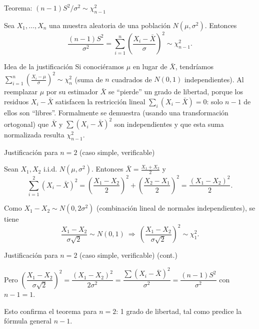\documentclass[aspectratio=169,11pt]{beamer}
\begin{document}
\begin{frame}{Teorema: $(n-1)S^2/\sigma^2 \sim \chi^2_{n-1}$}
\begin{theorem}
Sea $X_1,\dots,X_n$ una muestra aleatoria de una población $N(\mu,\sigma^2)$. Entonces
$$\frac{(n-1)S^2}{\sigma^2} = \sum_{i=1}^n \left(\frac{X_i-\bar X}{\sigma}\right)^2 \sim \chi^2_{n-1}.$$
\end{theorem}

\begin{block}{Idea de la justificación}
Si conociéramos $\mu$ en lugar de $\bar X$, tendríamos $\sum_{i=1}^n \left(\frac{X_i-\mu}{\sigma}\right)^2 \sim \chi^2_n$ (suma de $n$ cuadrados de $N(0,1)$ independientes). Al reemplazar $\mu$ por su estimador $\bar X$ se ``pierde'' un grado de libertad, porque los residuos $X_i-\bar X$ satisfacen la restricción lineal $\sum_i (X_i-\bar X)=0$: solo $n-1$ de ellos son ``libres''. Formalmente se demuestra (usando una transformación ortogonal) que $\bar X$ y $\sum(X_i-\bar X)^2$ son independientes y que esta suma normalizada resulta $\chi^2_{n-1}$.
\end{block}
\end{frame}

\begin{frame}{Justificación para $n=2$ (caso simple, verificable)}
\begin{example}
Sean $X_1,X_2$ i.i.d. $N(\mu,\sigma^2)$. Entonces $\bar X = \frac{X_1+X_2}{2}$ y
$$\sum_{i=1}^2 (X_i-\bar X)^2 = \left(\frac{X_1-X_2}{2}\right)^2 + \left(\frac{X_2-X_1}{2}\right)^2 = \frac{(X_1-X_2)^2}{2}.$$

Como $X_1-X_2 \sim N(0,2\sigma^2)$ (combinación lineal de normales independientes), se tiene
$$\frac{X_1-X_2}{\sigma\sqrt 2} \sim N(0,1) \ \Rightarrow \ \left(\frac{X_1-X_2}{\sigma\sqrt2}\right)^2 \sim \chi^2_1.$$

\end{example}
\end{frame}

\begin{frame}{Justificación para $n=2$ (caso simple, verificable) (cont.)}
\begin{example}
Pero $\left(\dfrac{X_1-X_2}{\sigma\sqrt2}\right)^2 = \dfrac{(X_1-X_2)^2}{2\sigma^2} = \dfrac{\sum(X_i-\bar X)^2}{\sigma^2} = \dfrac{(n-1)S^2}{\sigma^2}$ con $n-1=1$.

Esto confirma el teorema para $n=2$: 1 grado de libertad, tal como predice la fórmula general $n-1$.
\end{example}
\end{frame}
\end{document}
